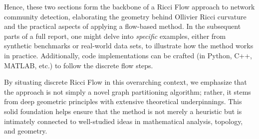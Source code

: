 Hence, these two sections form the backbone of a Ricci Flow approach to network community detection, elaborating the geometry behind Ollivier Ricci curvature and the practical aspects of applying a flow-based method. In the subsequent parts of a full report, one might delve into \emph{specific} examples, either from synthetic benchmarks or real-world data sets, to illustrate how the method works in practice. Additionally, code implementations can be crafted (in Python, C++, MATLAB, etc.) to follow the discrete flow steps. 

By situating discrete Ricci Flow in this overarching context, we emphasize that the approach is not simply a novel graph partitioning algorithm; rather, it stems from deep geometric principles with extensive theoretical underpinnings. This solid foundation helps ensure that the method is not merely a heuristic but is intimately connected to well-studied ideas in mathematical analysis, topology, and geometry.